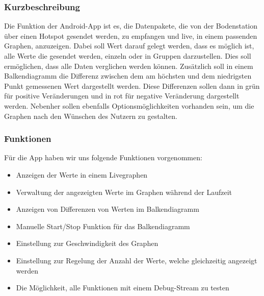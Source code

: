 \subsubsection{Kurzbeschreibung}
Die Funktion der Android-App ist es, die Datenpakete, die von der Bodenstation über einen Hotspot gesendet werden, zu empfangen und live, in einem passenden Graphen, anzuzeigen. Dabei soll Wert darauf gelegt werden, dass es möglich ist, alle Werte die gesendet werden, einzeln oder in Gruppen darzustellen. Dies soll ermöglichen, dass alle Daten verglichen werden können. Zusätzlich soll in einem Balkendiagramm die Differenz zwischen dem am höchsten und dem niedrigsten Punkt gemessenen Wert dargestellt werden. Diese Differenzen sollen dann in grün für positive Veränderungen und in rot für negative Veränderung dargestellt werden. Nebenher sollen ebenfalls Optionsmöglichkeiten vorhanden sein, um die Graphen nach den Wünschen des Nutzern zu gestalten.

\subsubsection{Funktionen}
Für die App haben wir uns folgende Funktionen vorgenommen:
\begin{itemize}
	\item Anzeigen der Werte in einem Livegraphen
	\item Verwaltung der angezeigten Werte im Graphen während der Laufzeit
	\item Anzeigen von Differenzen von Werten im Balkendiagramm
	\item Manuelle Start/Stop Funktion für das Balkendiagramm
	\item Einstellung zur Geschwindigkeit des Graphen
	\item Einstellung zur Regelung der Anzahl der Werte, welche gleichzeitig angezeigt werden
	\item Die Möglichkeit, alle Funktionen mit einem Debug-Stream zu testen
\end{itemize}
